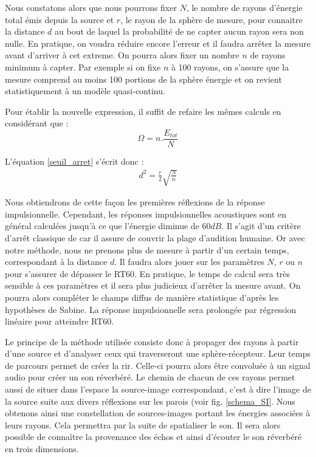 Nous constatons alors que nous pourrons fixer $N$, le nombre de rayons d'énergie total émis depuis la source et $r$, le rayon de la sphère de mesure, pour connaitre la distance $d$ au bout de laquel la probabilité de ne capter aucun rayon sera non nulle. En pratique, on voudra réduire encore l'erreur et il faudra arrêter la mesure avant d'arriver à cet extreme. On pourra alors fixer un nombre $n$ de rayons minimum à capter. Par exemple si on fixe $n$ à 100 rayons, on s'assure que la mesure comprend au moins 100 portions de la sphère énergie et on revient statistiquement à un modèle quasi-continu.

Pour établir la nouvelle expression, il suffit de refaire les mêmes calculs en considérant que :
\begin{equation}
	\Omega = n.\frac{E_{tot}}{N}
\end{equation}

L'équation \ref{seuil_arret} s'écrit donc :
\begin{align} 
d^2 = \frac{r}{2}\sqrt{\frac{N}{n}}
\end{align}

Nous obtiendrons de cette façon les premières réflexions de la réponse impulsionnelle. Cependant, les réponses impulsionnelles acoustiques sont en général calculées jusqu'à ce que l'énergie diminue de $60dB$. Il s'agit d'un critère d'arrêt classique de car il assure de couvrir la plage d'audition humaine. Or avec notre méthode, nous ne prenons plus de mesure à partir d'un certain temps, correspondant à la distance $d$. Il faudra alors jouer sur les paramètres $N$, $r$ ou $n$ pour s'assurer de dépasser le \gls{RT60}. En pratique, le temps de calcul sera très sensible à ces paramètres et il sera plus judicieux d'arrêter la mesure avant. On pourra alors compléter le champs diffus de manière statistique d'après les hypothèses de Sabine. La réponse impulsionnelle sera prolongée par régression linéaire pour atteindre \gls{RT60}.


Le principe de la méthode utilisée consiste donc à propager des rayons à partir d'une source et d'analyser ceux qui traverseront une sphère-récepteur. Leur temps de parcours permet de créer la \gls{rir}. Celle-ci pourra alors être convoluée à un signal audio pour créer un son réverbéré. Le chemin de chacun de ces rayons permet aussi de situer dans l'espace la source-image correspondant, c'est à dire l'image de la source suite aux divers réflexions sur les parois (voir fig. \ref{schema_SI}. Nous obtenons ainsi une constellation de sources-images portant les énergies associées à leurs rayons. Cela permettra par la suite de spatialiser le son. Il sera alors possible de connaître la provenance des échos et ainsi d'écouter le son réverbéré en trois dimensions.

